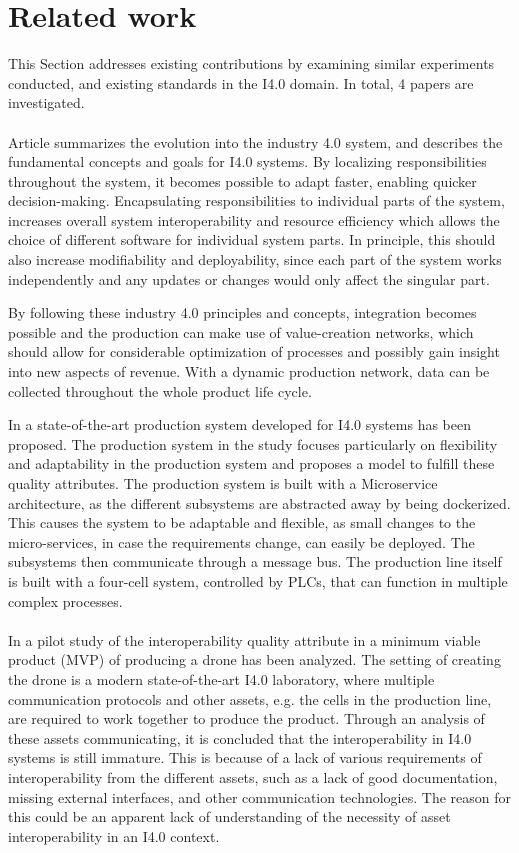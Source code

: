 \section{Related work}
\label{sec:related_work}
This Section addresses existing contributions by examining similar experiments conducted, and existing standards in the I4.0 domain. 
In total, 4 papers are investigated.
\\ \\
Article \cite{Lasi2014} summarizes the evolution into the industry 4.0 system, and describes the fundamental concepts and goals for I4.0 systems. By localizing responsibilities throughout the system, it becomes possible to adapt faster, enabling quicker decision-making.
Encapsulating responsibilities to individual parts of the system, increases overall system interoperability and resource efficiency which allows the choice of different software for individual system parts. 
In principle, this should also increase modifiability and deployability, since each part of the system works independently and any updates or changes would only affect the singular part. 

By following these industry 4.0 principles and concepts, integration becomes possible and the production can make use of value-creation networks, which should allow for considerable optimization of processes and possibly gain insight into new aspects of revenue. With a dynamic production network, data can be collected throughout the whole product life cycle.



In \cite{torben21} a state-of-the-art production system developed for I4.0 systems has been proposed. The production system in the study focuses particularly on flexibility and adaptability in the production system and proposes a model to fulfill these quality attributes. The production system is built with a Microservice architecture, as the different subsystems are abstracted away by being dockerized. This causes the system to be adaptable and flexible, as small changes to the micro-services, in case the requirements change, can easily be deployed.  The subsystems then communicate through a message bus. The production line itself is built with a four-cell system, controlled by PLCs, that can function in multiple complex processes.
\\ \\
In \cite{torben20pilot} a pilot study of the interoperability quality attribute in a minimum viable product (MVP) of producing a drone has been analyzed. The setting of creating the drone is a modern state-of-the-art I4.0 laboratory, where multiple communication protocols and other assets, e.g. the cells in the production line, are required to work together to produce the product. Through an analysis of these assets communicating, it is concluded that the interoperability in I4.0 systems is still immature. This is because of a lack of various requirements of interoperability from the different assets, such as a lack of good documentation, missing external interfaces, and other communication technologies. The reason for this could be an apparent lack of understanding of the necessity of asset interoperability in an I4.0 context.



